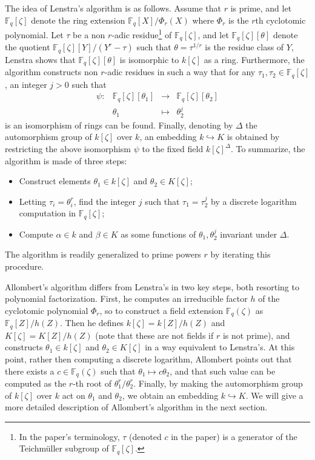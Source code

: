 \documentclass[12pt]{article}
\theoremstyle{plain}
\theoremstyle{definition}
\def\F{\ensuremath{\mathbb{F}}}
\newcounter{algorithm}
\begin{document}
The idea of Lenstra's algorithm is as follows.
Assume that $r$ is prime, and
let $\F_q[\zeta]$ denote the ring extension $\F_q[X] / \Phi_r(X)$ where $\Phi_r$ is the $r$th 
cyclotomic polynomial. 
Let $\tau$ be a non $r$-adic residue\footnote{In the paper's terminology, $\tau$ (denoted $c$ in the paper) is a generator of the Teichm\"uller subgroup of $\F_q[\zeta]$.} of $\F_q[\zeta]$,
and let $\F_q[\zeta][\theta]$ denote the quotient $\F_q[\zeta][Y]/(Y^r - 
\tau)$ such that $\theta=\tau^{1/r}$ is the residue class of $Y$, 
Lenstra shows that $\F_q[\zeta][\theta]$ is isomorphic to $k[\zeta]$ as a ring.
Furthermore, the algorithm constructs non $r$-adic residues in such a way that for any $\tau_1, \tau_2 \in \F_q[\zeta]$, 
an integer $j > 0$ such that
\[
\begin{array}{lrll}
\psi: & \F_q[\zeta][\theta_1] & \rightarrow & \F_q[\zeta][\theta_2] \\
& \theta_1 & \mapsto & \theta_2^j
\end{array}
\]
is an isomorphism of rings can be found.
Finally, denoting by $\Delta$ the automorphism group of $k[\zeta]$
over $k$, an embedding $k \hookrightarrow K$ is obtained by
restricting the above isomorphism $\psi$ to the fixed field
$k[\zeta]^\Delta$.
To summarize, the algorithm is made of three steps:
\begin{itemize}
\item Construct elements $\theta_1\in k[\zeta]$ and $\theta_2\in K[\zeta]$;
\item Letting $\tau_i=\theta_i^r$, find the integer $j$ such that
  $\tau_1=\tau_2^j$ by a discrete logarithm computation in
  $\F_q[\zeta]$;
\item Compute $\alpha\in k$ and $\beta\in K$ as some functions of
  $\theta_1,\theta_2^j$ invariant under $\Delta$.
\end{itemize}
The algorithm is readily generalized to prime powers $r$ by iterating
this procedure.

Allombert's algorithm differs from Lenstra's in two key steps, both
resorting to polynomial factorization.  First, he computes an
irreducible factor $h$ of the cyclotomic polynomial $\Phi_r$, so to
construct a field extension $\F_q(\zeta)$ as $\F_q[Z]/h(Z)$.  Then he
defines $k[\zeta]=k[Z]/h(Z)$ and $K[\zeta]=K[Z]/h(Z)$ (note that these
are not fields if $r$ is not prime), and constructs
$\theta_1\in k[\zeta]$ and $\theta_2\in K[\zeta]$ in a way equivalent
to Lenstra's.  At this point, rather then computing a discrete
logarithm, Allombert points out that there exists a $c\in\F_q(\zeta)$
such that $\theta_1\mapsto c\theta_2$, and that such value can be
computed as the $r$-th root of $\theta_1^r/\theta_2^r$.
Finally, by making the automorphism group of $k[\zeta]$ over $k$ act
on $\theta_1$ and $\theta_2$, we obtain an embedding $k \hookrightarrow K$.
We will give a more detailed description of Allombert's algorithm in the next section.
\end{document}
